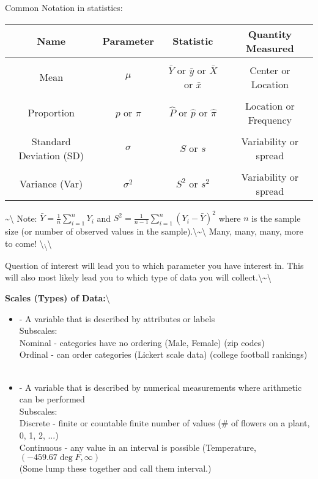 \documentclass[]{book}
\begin{document}
Common Notation in statistics:

\begin{center}
\begin{tabular}{c|ccc}
Name & Parameter & Statistic & Quantity Measured\\
\hline
&&&\\
Mean & $\mu$ & $\bar{Y}$ or $\bar{y}$ or $\bar{X}$ or $\bar{x}$ & Center or Location\\
&&&\\
Proportion & $p$ or $\pi$ & $\hat{P}$ or $\hat{p}$ or $\hat{\pi}$ & Location or Frequency\\
&&&\\
Standard Deviation (SD) & $\sigma$ & $S$ or $s$ & Variability or spread\\
&&&\\
Variance (Var) & $\sigma^2$ & $S^2$ or $s^2$ & Variability or spread\\
\end{tabular}
\end{center}

\textasciitilde{}\textbackslash{} Note:
\(\bar{Y}=\frac{1}{n}\sum_{i=1}^{n}Y_i\) and
\(S^2=\frac{1}{n-1}\sum_{i=1}^{n}(Y_i-\bar{Y})^2\) where \(n\) is the
sample size (or number of observed values in the
sample).\textbackslash{}\textasciitilde{}\textbackslash{} Many, many,
many, more to come!
\textbackslash{}\textsubscript{\textbackslash{}}\textbackslash{}

Question of interest will lead you to which parameter you have interest
in. This will also most likely lead you to which type of data you will
collect.\textbackslash{}\textasciitilde{}\textbackslash{}

\textbf{Scales (Types) of Data:}\textbackslash{}

\begin{itemize}
\item \underbar{~~~~~~~~~~~~~~~~~~~~~~~~~~~~~~~~~~~~~~~~~~~~~~~~~} - A variable that is described by attributes or labels\\
\indent Subscales: \\
Nominal - categories have no ordering (Male, Female) (zip codes)\\
Ordinal - can order categories (Lickert scale data) (college football rankings)\\~\\
\item \underbar{~~~~~~~~~~~~~~~~~~~~~~~~~~~~~~~} - A variable that is described by numerical measurements where arithmetic can be performed\\
\indent Subscales: \\
Discrete - finite or countable finite number of values (\# of flowers on a plant, 0, 1, 2, ...)\\
Continuous - any value in an interval is possible (Temperature, $(-459.67\deg F, \infty)$\\
(Some lump these together and call them interval.)
\end{itemize}
\end{document}
